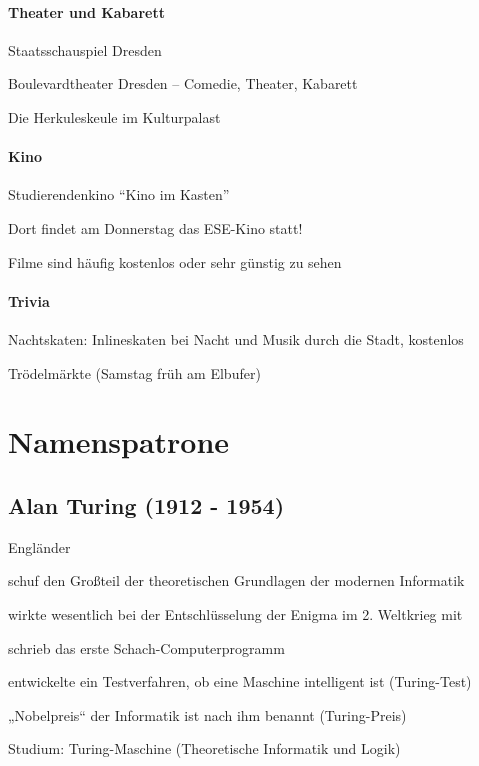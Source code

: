 \documentclass[a4paper,12pt]{scrreprt}
\begin{document}
\subsubsection{Theater und Kabarett}
\begin{itemize*}
    \item Staatsschauspiel Dresden
    \item Boulevardtheater Dresden -- Comedie, Theater, Kabarett
    \item Die Herkuleskeule im Kulturpalast
\end{itemize*}

\subsubsection{Kino}
\begin{itemize*}
    \item Studierendenkino \enquote{Kino im Kasten}
    \item Dort findet am Donnerstag das ESE-Kino statt!
    \item Filme sind häufig kostenlos oder sehr günstig zu sehen
\end{itemize*}

\subsubsection{Trivia}
\begin{itemize*}
    \item Nachtskaten: Inlineskaten bei Nacht und Musik durch die Stadt, kostenlos
    \item Trödelmärkte (Samstag früh am Elbufer)
\end{itemize*}

\bigskip
\bigskip
\chapter{Namenspatrone}
\section*{Alan Turing (1912 - 1954)}
\begin{itemize*}
    \item Engländer
    \item schuf den Großteil der theoretischen Grundlagen der modernen Informatik
    \item wirkte wesentlich bei der Entschlüsselung der Enigma im 2. Weltkrieg mit
    \item schrieb das erste Schach-Computerprogramm
    \item entwickelte ein Testverfahren, ob eine Maschine intelligent ist (Turing-Test)
    \item „Nobelpreis“ der Informatik ist nach ihm benannt (Turing-Preis)
    \item Studium: Turing-Maschine (Theoretische Informatik und Logik)
\end{itemize*}
\end{document}
